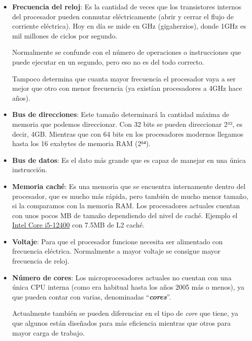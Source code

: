 \begin{itemize}
    \item \textbf{Frecuencia del reloj}: Es la cantidad de veces que los transistores internos del procesador pueden conmutar eléctricamente (abrir y cerrar el flujo de corriente eléctrica). Hoy en día se mide en GHz (gigaherzios), donde 1GHz es mil millones de ciclos por segundo.

    Normalmente se confunde con el número de operaciones o instrucciones que puede ejecutar en un segundo, pero eso no es del todo correcto.

    Tampoco determina que cuanta mayor frecuencia el procesador vaya a ser mejor que otro con menor frecuencia (ya existían procesadores a 4GHz hace años).

    \item \textbf{Bus de direcciones}: Este tamaño determinará la cantidad máxima de memoria que podemos direccionar. Con 32 bits se pueden direccionar 2³², es decir, 4GB. Mientras que con 64 bits en los procesadores modernos llegamos hasta los 16 exabytes de memoria RAM (2⁶⁴).

    \item \textbf{Bus de datos}: Es el dato más grande que es capaz de manejar en una única instrucción.

    \item \textbf{Memoria caché}: Es una memoria que se encuentra internamente dentro del procesador, que es mucho más rápida, pero también de mucho menor tamaño, si la comparamos con la memoria RAM. Los procesadores actuales cuentan con unos pocos MB de tamaño dependiendo del nivel de caché. Ejemplo el \href{https://ark.intel.com/content/www/us/en/ark/products/134586/intel-core-i512400-processor-18m-cache-up-to-4-40-ghz.html}{Intel Core i5-12400} con 7.5MB de L2 caché.

    \item \textbf{Voltaje}: Para que el procesador funcione necesita ser alimentado con frecuencia eléctrica. Normalmente a mayor voltaje se consigue mayor frecuencia de reloj.

    \item \textbf{Número de cores}: Los microprocesadores actuales no cuentan con una única CPU interna (como era habitual hasta los años 2005 más o menos), ya que pueden contar con varias, denominadas “\textit{\textbf{cores}}”.

    Actualmente también se pueden diferenciar en el tipo de \textit{core} que tiene, ya que algunos están diseñados para más eficiencia mientras que otros para mayor carga de trabajo.
\end{itemize}


